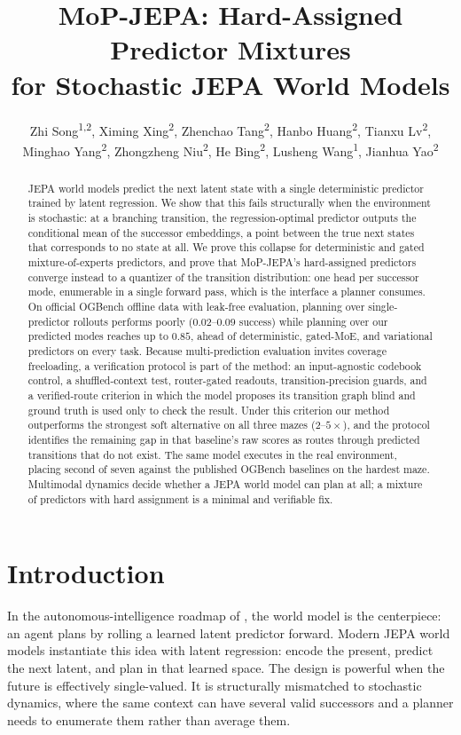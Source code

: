 \documentclass[letterpaper]{article}
\title{MoP-JEPA: Hard-Assigned Predictor Mixtures\\ for Stochastic JEPA World Models}
\author{
Zhi Song\textsuperscript{\rm 1,\rm 2},
Ximing Xing\textsuperscript{\rm 2},
Zhenchao Tang\textsuperscript{\rm 2},
Hanbo Huang\textsuperscript{\rm 2},
Tianxu Lv\textsuperscript{\rm 2},
Minghao Yang\textsuperscript{\rm 2},
Zhongzheng Niu\textsuperscript{\rm 2},
He Bing\corresponding\textsuperscript{\rm 2},
Lusheng Wang\corresponding\textsuperscript{\rm 1},
Jianhua Yao\corresponding\textsuperscript{\rm 2}\\
}
\begin{document}
\maketitle
\enlargethispage{1pt}

\begin{abstract}
JEPA world models predict the next latent state with a single deterministic predictor trained by latent
regression. We show that this fails structurally when the environment is stochastic: at a branching
transition, the regression-optimal predictor outputs the conditional mean of the successor embeddings, a
point between the true next states that corresponds to no state at all. We prove this collapse for
deterministic and gated mixture-of-experts predictors, and prove that MoP-JEPA's hard-assigned predictors
converge instead to a quantizer of the transition distribution: one head per
successor mode, enumerable in a single forward pass, which is the interface a planner consumes. On
official OGBench offline data with leak-free evaluation, planning over single-predictor rollouts performs
poorly ($0.02$--$0.09$ success) while planning over our predicted modes reaches up to $0.85$, ahead of
deterministic, gated-MoE, and variational predictors on every task. Because multi-prediction evaluation
invites coverage freeloading, a verification protocol is part of the method: an input-agnostic codebook
control, a shuffled-context test, router-gated readouts, transition-precision guards, and a verified-route
criterion in which the model proposes its transition graph blind and ground truth is used only to check the
result. Under this criterion our method outperforms the strongest soft alternative on all three mazes
($2$--$5\times$), and the protocol identifies the remaining gap in that baseline's raw scores as routes
through predicted transitions that do not exist. The same model executes in the real environment,
placing second of seven against the published OGBench baselines on the hardest maze. Multimodal dynamics
decide whether a JEPA world model can plan at all; a mixture of predictors with hard assignment is a
minimal and verifiable fix.
\end{abstract}

\section{Introduction}

In the autonomous-intelligence roadmap of \citet{lecun2022path}, the world model is the centerpiece: an
agent plans by rolling a learned latent predictor forward. Modern JEPA world models
\citep{zhou2024dinowm,assran2025vjepa2} instantiate this idea with latent regression: encode the present,
predict the next latent, and plan in that learned space. The design is powerful when the future is
effectively single-valued. It is structurally mismatched to stochastic dynamics, where the same context can
have several valid successors and a planner needs to enumerate them rather than average them.
\end{document}
